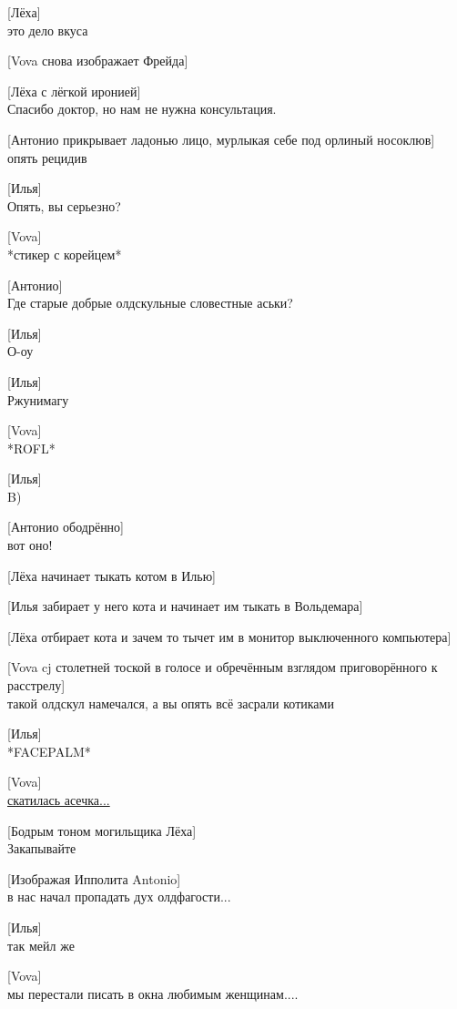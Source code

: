 [Лёха]\\
это дело вкуса


[Vova снова изображает Фрейда]


[Лёха с лёгкой иронией]\\
Спасибо доктор, но нам не нужна консультация.


[Антонио прикрывает ладонью лицо, мурлыкая себе под орлиный носоклюв]\\
опять рецидив


[Илья]\\
Опять, вы серьезно?


[Vova]\\
*стикер с корейцем*


[Антонио]\\
Где старые добрые олдскульные словестные аськи?


[Илья]\\
О-оу


[Илья]\\
Ржунимагу


[Vova]\\
*ROFL*


[Илья]\\
B)


[Антонио ободрённо]\\
вот оно!

[Лёха начинает тыкать котом в Илью]


[Илья забирает у него кота и начинает им тыкать в Вольдемара]


[Лёха отбирает кота и зачем то тычет им в монитор выключенного компьютера]


[Vova cj столетней тоской в голосе и обречённым взглядом приговорённого к расстрелу]\\
такой олдскул намечался, а вы опять всё засрали котиками


[Илья]\\
*FACEPALM*

[Vova]\\
\href{https://icq.com/windows/ru}{скатилась асечка...}


[Бодрым тоном могильщика Лёха]\\
Закапывайте


[Изображая Ипполита Antonio]\\
в нас начал пропадать дух олдфагости...


[Илья]\\
так мейл же


[Vova]\\
мы перестали писать в окна любимым женщинам....


